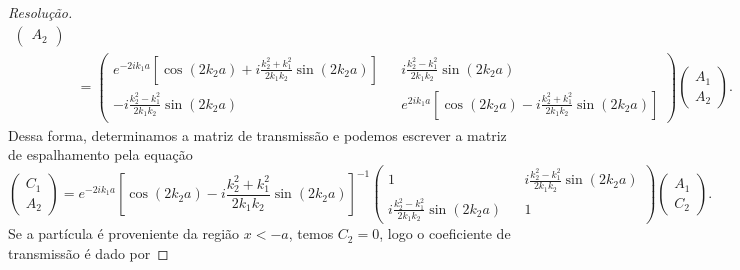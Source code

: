 \begin{proof}[Resolução]
\begin{align*}
\begin{pmatrix}
            A_2
        \end{pmatrix}\\
        &= \begin{pmatrix}
            e^{-2ik_1 a} \left[\cos(2k_2a) + i\frac{k_2^2 + k_1^2}{2k_1k_2} \sin(2k_2a)\right]&& i\frac{k_2^2 - k_1^2}{2k_1k_2} \sin(2k_2 a)\\
            -i\frac{k_2^2 - k_1^2}{2k_1k_2}\sin(2k_2 a) && e^{2ik_1 a} \left[\cos(2k_2a) - i\frac{k_2^2 + k_1^2}{2k_1k_2} \sin(2k_2a)\right]
        \end{pmatrix}
        \begin{pmatrix}
            A_1\\
            A_2
        \end{pmatrix}.
    \end{align*}
    Dessa forma, determinamos a matriz de transmissão e podemos escrever a matriz de espalhamento pela equação
    \begin{equation*}
        \begin{pmatrix}
            C_1 \\
            A_2
        \end{pmatrix} =
        e^{-2ik_1 a} \left[\cos(2k_2a) - i\frac{k_2^2 + k_1^2}{2k_1k_2} \sin(2k_2a)\right]^{-1} \begin{pmatrix}
            1 && i\frac{k_2^2 - k_1^2}{2k_1k_2} \sin(2k_2 a)\\
            i\frac{k_2^2 - k_1^2}{2k_1k_2} \sin(2k_2 a) && 1
        \end{pmatrix}
        \begin{pmatrix}
            A_1 \\
            C_2
        \end{pmatrix}.
    \end{equation*}
    Se a partícula é proveniente da região \(x < -a\), temos \(C_2 = 0\), logo o coeficiente de transmissão é dado por
\end{proof}
